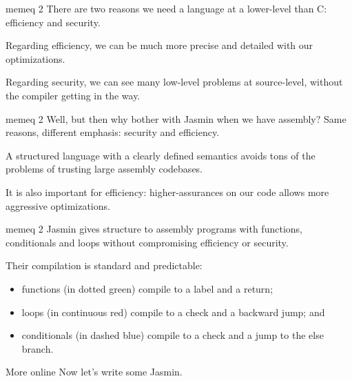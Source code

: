 \documentclass[
  xcolor={table,dvipsnames},
]{beamer}
\newcommand{\hint}[1]{{\color{Red}{[HINT: #1]}}}
\newcommand{\nextframe}{\hint{NEXT FRAME}}
\begin{document}
\begin{frame}{memeq 2}
  There are two reasons we need a language at a lower-level than C: efficiency
  and security.

  \vfill

  Regarding efficiency, we can be much more precise and detailed with our
  optimizations.

  \vfill

  Regarding security, we can see many low-level problems at source-level,
  without the compiler getting in the way.
\end{frame}


\begin{frame}{memeq 2}
  Well, but then why bother with Jasmin when we have assembly?
  Same reasons, different emphasis: security and efficiency.

  \vfill

  A structured language with a clearly defined semantics avoids tons of the
  problems of trusting large assembly codebases.

  \vfill

  It is also important for efficiency: higher-assurances on our code allows more
  aggressive optimizations.
\end{frame}

\begin{frame}{memeq 2}
  Jasmin gives structure to assembly programs with functions, conditionals and
  loops without compromising efficiency or security.

  \nextframe

  Their compilation is standard and predictable:
  \begin{itemize}
  \itemsep=1em
  \item[] functions (in dotted green) compile to a label and a return;
  \item[] loops (in continuous red) compile to a check and a backward jump; and
  \item[] conditionals (in dashed blue) compile to a check and a jump to the
  else branch.
  \end{itemize}
\end{frame}

\begin{frame}{More online}
  Now let's write some Jasmin.

  \hint{Have people open the files and setup Docker.}

  \hint{Leave the Formosa slide while people work.}
\end{frame}
\end{document}
